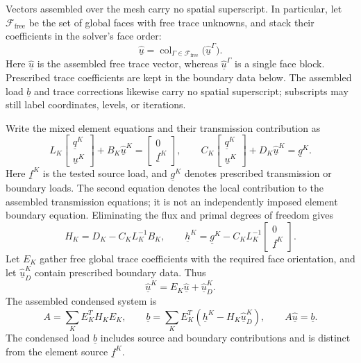 \documentclass[11pt]{article}
\numberwithin{equation}{section}
\numberwithin{figure}{section}
\numberwithin{table}{section}
\begin{document}
Vectors assembled over the mesh carry no spatial superscript. In particular,
let $\mathcal F_{\mathrm{free}}$ be the set of global faces with free trace
unknowns, and stack their coefficients in the solver's face order:
\[
 \underline{\widehat{u}}
 =\operatorname{col}_{\Gamma\in\mathcal F_{\mathrm{free}}}
   \bigl(\underline{\widehat{u}}^\Gamma\bigr).
\]
Here $\underline{\widehat{u}}$ is the assembled free trace vector,
whereas $\underline{\widehat{u}}^\Gamma$ is a single face block.
Prescribed trace coefficients are kept in the boundary data below.
The assembled load $\underline{b}$ and trace corrections likewise carry no
spatial superscript; subscripts may still label coordinates, levels, or
iterations.

Write the mixed element equations and their transmission contribution as
\[
 L_K
 \begin{bmatrix}\underline{q}^K\\\underline{u}^K\end{bmatrix}
 +B_K\underline{\widehat{u}}^K
 =\begin{bmatrix}0\\\underline{f}^K\end{bmatrix},\qquad
 C_K\begin{bmatrix}\underline{q}^K\\\underline{u}^K\end{bmatrix}
 +D_K\underline{\widehat{u}}^K=\underline{g}^K.
\]
Here $\underline{f}^K$ is the tested source load, and
$\underline{g}^K$ denotes prescribed transmission or boundary loads.
The second equation denotes the local contribution to the assembled transmission
equations; it is not an independently imposed element boundary equation.
Eliminating the flux and primal degrees of freedom gives
\[
 H_K=D_K-C_K L_K^{-1}B_K,\qquad
 \underline{h}^K=\underline{g}^K-C_K L_K^{-1}
 \begin{bmatrix}0\\\underline{f}^K\end{bmatrix}.
\]
Let $E_K$ gather free global trace coefficients with the required face
orientation, and let $\underline{\widehat{u}}_D^K$ contain prescribed boundary
data. Thus
\[
 \underline{\widehat{u}}^K
 =E_K\underline{\widehat{u}}+\underline{\widehat{u}}_D^K.
\]
The assembled condensed system is
\[
 A=\sum_K E_K^T H_K E_K,\qquad
 \underline{b}=\sum_K E_K^T
 (\underline{h}^K-H_K\underline{\widehat{u}}_D^K),\qquad
 A\underline{\widehat{u}}=\underline{b}.
\]
The condensed load $\underline{b}$ includes source and boundary
contributions and is distinct from the element source $\underline{f}^K$.
\end{document}
